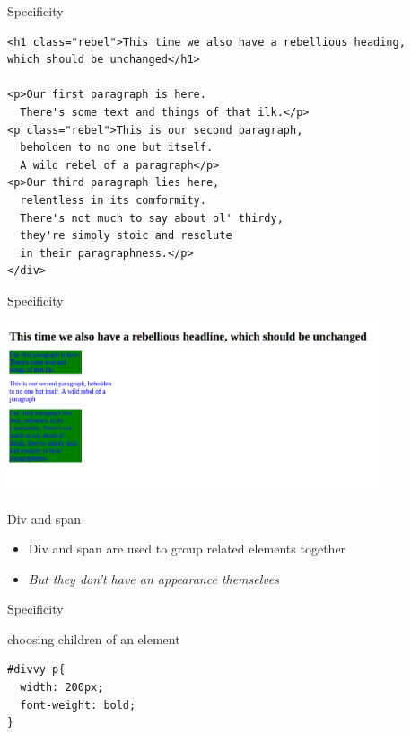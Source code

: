 \documentclass{beamer}
\begin{document}
\begin{frame}[fragile]{Specificity}
 \begin{block}{}
\begin{verbatim}
<h1 class="rebel">This time we also have a rebellious heading, 
which should be unchanged</h1>

<p>Our first paragraph is here.
  There's some text and things of that ilk.</p>
<p class="rebel">This is our second paragraph, 
  beholden to no one but itself. 
  A wild rebel of a paragraph</p>
<p>Our third paragraph lies here,
  relentless in its comformity. 
  There's not much to say about ol' thirdy, 
  they're simply stoic and resolute
  in their paragraphness.</p>
</div>
\end{verbatim}
\end{block}
\end{frame}

\begin{frame}{Specificity}
\begin{block}{}
\includegraphics[width=11cm]{specific.png}
\end{block}
\end{frame}

\begin{frame}{Div and span}
  \begin{block}{}
    \begin{itemize}
      \item Div and span are used to group related elements together
      \item {\itshape But they don't have an appearance themselves}
    \end{itemize}
  \end{block}
\end{frame}

\begin{frame}[fragile]{Specificity}
 \begin{block}{choosing children of an element}
\begin{verbatim}
#divvy p{
  width: 200px;
  font-weight: bold;
}
\end{verbatim}
\end{block}
\end{frame}
\end{document}
